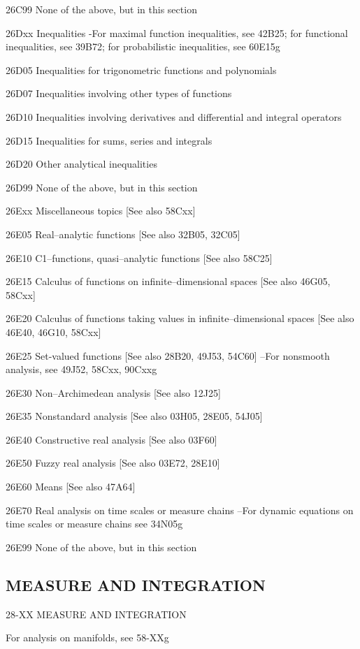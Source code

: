 \documentclass[12pt]{article}
\theoremstyle{plain}
\theoremstyle{definition}
\numberwithin{equation}{section}
\begin{document}
{{26C99 None of the above, but in this section

26Dxx Inequalities 
-For maximal function inequalities, see 42B25; for functional inequalities, see 39B72; for probabilistic inequalities, see 60E15g

26D05 Inequalities for trigonometric functions and polynomials

26D07 Inequalities involving other types of functions

26D10 Inequalities involving derivatives and differential and integral operators

26D15 Inequalities for sums, series and integrals

26D20 Other analytical inequalities

26D99 None of the above, but in this section

26Exx Miscellaneous topics [See also 58Cxx]

26E05 Real--analytic functions [See also 32B05, 32C05]

26E10 C1--functions, quasi--analytic functions [See also 58C25]

26E15 Calculus of functions on infinite--dimensional spaces [See also 46G05, 58Cxx]

26E20 Calculus of functions taking values in infinite--dimensional spaces [See also 46E40, 46G10, 58Cxx]

26E25 Set-valued functions [See also 28B20, 49J53, 54C60] --For nonsmooth analysis, see 49J52, 58Cxx, 90Cxxg

26E30 Non--Archimedean analysis [See also 12J25]

26E35 Nonstandard analysis [See also 03H05, 28E05, 54J05]

26E40 Constructive real analysis [See also 03F60]

26E50 Fuzzy real analysis [See also 03E72, 28E10]

26E60 Means [See also 47A64]

26E70 Real analysis on time scales or measure chains --For dynamic equations on time scales or measure chains see 34N05g

26E99 None of the above, but in this section

\subsection{MEASURE AND INTEGRATION}

28-XX MEASURE AND INTEGRATION 

For analysis on manifolds, see 58-XXg

}}
\end{document}
